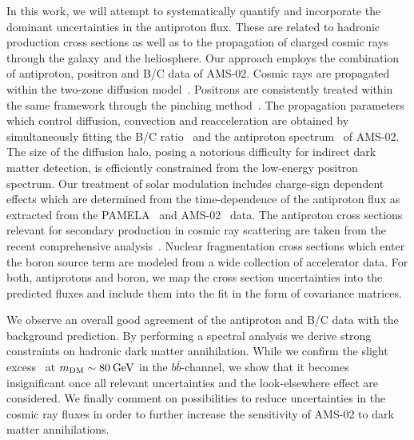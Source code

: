 \documentclass[a4paper,11pt]{article}
\newcommand{\eVdist}{\kern-0.06em}
\newcommand{\gev}{\:\text{Ge\eVdist V}}
\begin{document}
In this work, we will attempt to systematically quantify and incorporate the dominant uncertainties in the antiproton flux. These are related to hadronic production cross sections as well as to the propagation of charged cosmic rays through the galaxy and the heliosphere. Our approach employs the combination of antiproton, positron and B/C data of AMS-02. Cosmic rays are propagated within the two-zone diffusion model~\cite{Maurin:2001sj,Donato:2001ms,Maurin:2002ua}. Positrons are consistently treated within the same framework through the pinching method~\cite{Boudaud:2016jvj}. The propagation parameters which control diffusion, convection and reacceleration are obtained by simultaneously fitting the B/C ratio~\cite{Aguilar:2016vqr} and the antiproton spectrum~\cite{Aguilar:2016kjl} of AMS-02. The size of the diffusion halo, posing a notorious difficulty for indirect dark matter detection, is efficiently constrained from the low-energy positron spectrum. Our treatment of solar modulation includes charge-sign dependent effects which are determined from the time-dependence of the antiproton flux as extracted from the PAMELA~\cite{Adriani:2012paa} and AMS-02~\cite{Aguilar:2016kjl} data. The antiproton cross sections relevant for secondary production in cosmic ray scattering are taken from the recent comprehensive analysis~\cite{Winkler:2017xor}. Nuclear fragmentation cross sections which enter the boron source term are modeled from a wide collection of accelerator data. For both, antiprotons and boron, we map the cross section uncertainties into the predicted fluxes and include them into the fit in the form of covariance matrices.

We observe an overall good agreement of the antiproton and B/C data with the background prediction. By performing a spectral analysis we derive strong constraints on hadronic dark matter annihilation. While we confirm the slight excess~\cite{Cuoco:2016eej,Cui:2016ppb} at $m_{\text{DM}} \sim 80\gev$ in the $b\bar{b}$-channel, we show that it becomes insignificant once all relevant uncertainties and the look-elsewhere effect are considered. We finally comment on possibilities to reduce uncertainties in the cosmic ray fluxes in order to further increase the sensitivity of AMS-02 to dark matter annihilations.
\end{document}

